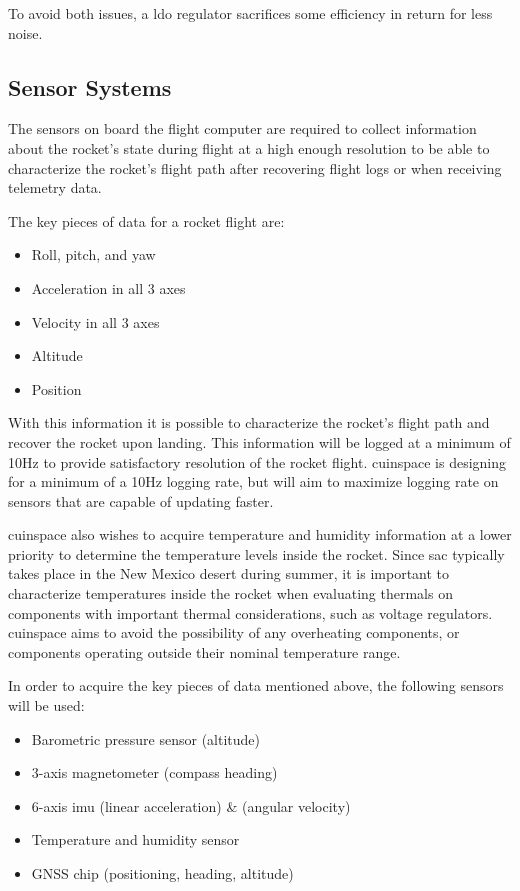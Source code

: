 To avoid both issues, a \gls{ldo} regulator sacrifices some efficiency in return for less noise.

\subsection{Sensor Systems}

The sensors on board the flight computer are required to collect information about the rocket's state during flight at
a high enough resolution to be able to characterize the rocket's flight path after recovering flight logs or when
receiving telemetry data.

The key pieces of data for a rocket flight are:

\begin{itemize}
    \item Roll, pitch, and yaw
    \item Acceleration in all 3 axes
    \item Velocity in all 3 axes
    \item Altitude
    \item Position
\end{itemize}

With this information it is possible to characterize the rocket's flight path and recover the rocket upon landing. This
information will be logged at a minimum of 10Hz to provide satisfactory resolution of the rocket flight.
\gls{cuinspace} is designing for a minimum of a 10Hz logging rate, but will aim to maximize logging rate on sensors
that are capable of updating faster.

\Gls{cuinspace} also wishes to acquire temperature and humidity information at a lower priority to determine the temperature levels inside the rocket. Since \gls{sac} typically takes place in the New Mexico desert during summer, it is important to characterize temperatures inside the rocket when evaluating thermals on components with important thermal considerations, such as voltage regulators. \Gls{cuinspace} aims to avoid the possibility of any overheating components, or components operating outside their nominal temperature range.

In order to acquire the key pieces of data mentioned above, the following sensors will be used:

\begin{itemize}
    \item Barometric pressure sensor (altitude)
    \item 3-axis magnetometer (compass heading)
    \item 6-axis \acrfull{imu} (linear acceleration) \& (angular velocity)
    \item Temperature and humidity sensor
    \item GNSS chip (positioning, heading, altitude)
\end{itemize}

